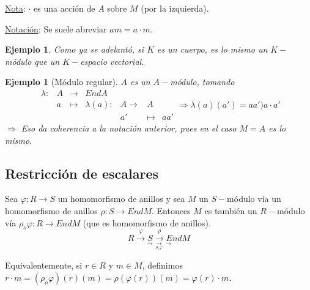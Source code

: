 \documentclass[11pt,a4paper]{article}
\theoremstyle{break}
\newtheorem{example}[theorem]{Ejemplo}
\begin{document}
\underline{Nota}: $\cdot$ es una acción de $A$ sobre $M$ (por la izquierda).

\underline{Notación}: Se suele abreviar $am = a \cdot m$.

\begin{example}
Como ya se adelantó, si $K$ es un cuerpo, es lo mismo un $K-$módulo que un $K-$espacio vectorial.
\end{example}

\begin{example}[Módulo regular]
$A$ es un $A-$módulo, tomando
$$\begin{aligned}
\lambda: & A & \to & EndA & & & \\
& a & \mapsto & \lambda(a): & A \to & A \\
& & & & a' & \mapsto & aa'
\end{aligned}
\Rightarrow \lambda(a)(a') = a a' ) a \cdot a'$$
$\Rightarrow$ Eso da coherencia a la notación anterior, pues en el caso $M = A$ es lo mismo.
\end{example}

\subsection*{Restricción de escalares}
Sea $\varphi: R \to S$ un homomorfismo de anillos y sea $M$ un $S-$módulo vía un homomorfismo de anillos $\rho: S \to End M$. Entonces $M$ es también un $R-$módulo vía $\rho_{o}\varphi: R \to End M$ (que es homomorfismo de anillos).
$$\underset{\underset{\rho_{o}\varphi}{\longrightarrow\longrightarrow\longrightarrow}}{R \overset{\varphi}{\to} S \overset{\rho}{\to} End M}$$

Equivalentemente, si $r \in R$ y $m \in M$, definimos $r \cdot m = (\rho_{o}\varphi)(r)(m) = \rho(\varphi(r))(m) = \varphi(r) \cdot m$.
\end{document}

